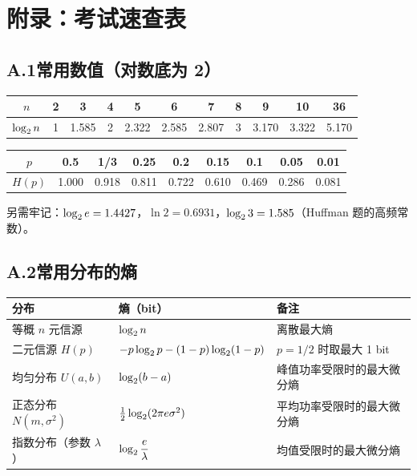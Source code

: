 \section{附录：考试速查表}

\subsection*{A.1\quad 常用数值（对数底为 2）}

\begin{center}
\renewcommand{\arraystretch}{1.2}
\begin{tabular}{c|cccccccccc}
\toprule
$n$ & 2 & 3 & 4 & 5 & 6 & 7 & 8 & 9 & 10 & 36\\
\midrule
$\log_{2} n$ & 1 & 1.585 & 2 & 2.322 & 2.585 & 2.807 & 3 & 3.170 & 3.322 & 5.170\\
\bottomrule
\end{tabular}
\end{center}

\begin{center}
\renewcommand{\arraystretch}{1.2}
\begin{tabular}{c|cccccccc}
\toprule
$p$ & 0.5 & 1/3 & 0.25 & 0.2 & 0.15 & 0.1 & 0.05 & 0.01\\
\midrule
$H(p)$ & 1.000 & 0.918 & 0.811 & 0.722 & 0.610 & 0.469 & 0.286 & 0.081\\
\bottomrule
\end{tabular}
\end{center}

另需牢记：$\log_{2} e=1.4427$，$\ln 2=0.6931$，$\log_{2} 3=1.585$（Huffman 题的高频常数）。

\subsection*{A.2\quad 常用分布的熵}

\begin{center}
\renewcommand{\arraystretch}{1.35}
\begin{tabular}{l|l|l}
\toprule
分布 & 熵（bit） & 备注\\
\midrule
等概 $n$ 元信源 & $\log_{2} n$ & 离散最大熵\\
二元信源 $H(p)$ & $-p\log_{2} p-(1-p)\log_{2}(1-p)$ & $p=1/2$ 时取最大 1 bit\\
均匀分布 $U(a,b)$ & $\log_{2}(b-a)$ & 峰值功率受限时的最大微分熵\\
正态分布 $N(m,\sigma^2)$ & $\tfrac12\log_{2}(2\pi e\sigma^2)$ & 平均功率受限时的最大微分熵\\
指数分布（参数 $\lambda$） & $\log_{2}\dfrac{e}{\lambda}$ & 均值受限时的最大微分熵\\
\bottomrule
\end{tabular}
\end{center}

